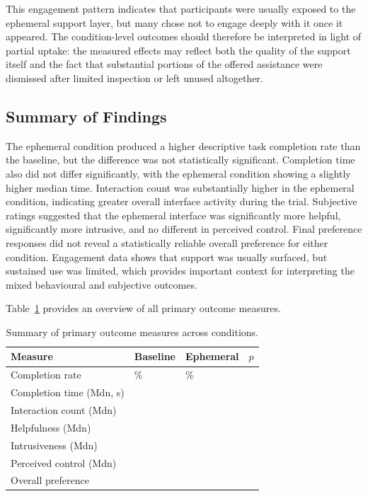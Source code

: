 This engagement pattern indicates that participants were usually exposed to the ephemeral support layer, but many chose not to engage deeply with it once it appeared. The condition-level outcomes should therefore be interpreted in light of partial uptake: the measured effects may reflect both the quality of the support itself and the fact that substantial portions of the offered assistance were dismissed after limited inspection or left unused altogether.

\subsection{Summary of Findings}

The ephemeral condition produced a higher descriptive task completion rate than the baseline, but the difference was not statistically significant. Completion time also did not differ significantly, with the ephemeral condition showing a slightly higher median time. Interaction count was substantially higher in the ephemeral condition, indicating greater overall interface activity during the trial. Subjective ratings suggested that the ephemeral interface was significantly more helpful, significantly more intrusive, and no different in perceived control. Final preference responses did not reveal a statistically reliable overall preference for either condition. Engagement data shows that support was usually surfaced, but sustained use was limited, which provides important context for interpreting the mixed behavioural and subjective outcomes.

Table~\ref{tab:results-summary} provides an overview of all primary outcome measures.

\begin{table}[htbp]
    \centering
    \caption{Summary of primary outcome measures across conditions.}
    \label{tab:results-summary}
    \begin{tabular}{@{}llll@{}}
        \toprule
        Measure & Baseline & Ephemeral & $p$ \\
        \midrule
        Completion rate & \GenSumCompPctB{}\% & \GenSumCompPctE{}\% & \GenSumMcNemarP{} \\
        Completion time (Mdn, s) & \GenSumTimeBMdn{} & \GenSumTimeEMdn{} & \GenSumTimeP{} \\
        Interaction count (Mdn) & \GenSumIntBMdn{} & \GenSumIntEMdn{} & \GenSumIntP{} \\
        Helpfulness (Mdn) & \GenSumHelpBMdn{} & \GenSumHelpEMdn{} & \GenSumHelpP{} \\
        Intrusiveness (Mdn) & \GenSumIntrBMdn{} & \GenSumIntrEMdn{} & \GenSumIntrP{} \\
        Perceived control (Mdn) & \GenSumCtrlBMdn{} & \GenSumCtrlEMdn{} & \GenSumCtrlP{} \\
        Overall preference & \multicolumn{2}{c}{\GenSumPrefOverall{}} & \GenSumPrefOverallP{} \\
        \bottomrule
    \end{tabular}
\end{table}
